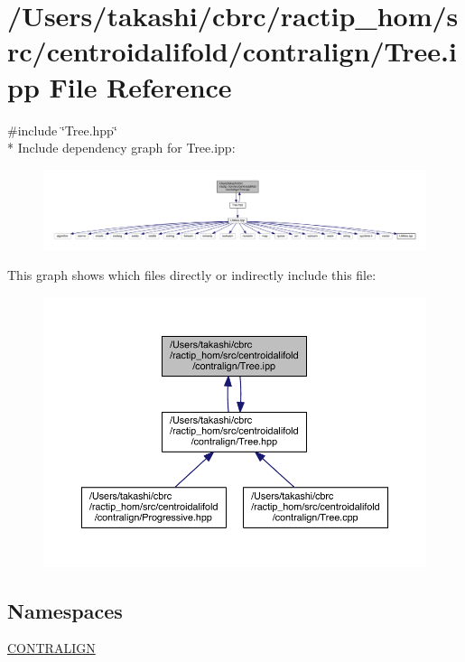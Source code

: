 \hypertarget{_tree_8ipp}{\section{/\+Users/takashi/cbrc/ractip\+\_\+hom/src/centroidalifold/contralign/\+Tree.ipp File Reference}
\label{_tree_8ipp}
}
{\ttfamily \#include \char`\"{}Tree.\+hpp\char`\"{}}\\*
Include dependency graph for Tree.\+ipp\+:
\nopagebreak
\begin{figure}[H]
\begin{center}
\leavevmode
\includegraphics[width=350pt]{_tree_8ipp__incl}
\end{center}
\end{figure}
This graph shows which files directly or indirectly include this file\+:
\nopagebreak
\begin{figure}[H]
\begin{center}
\leavevmode
\includegraphics[width=350pt]{_tree_8ipp__dep__incl}
\end{center}
\end{figure}
\subsection*{Namespaces}
\begin{DoxyCompactItemize}
\item 
 \hyperlink{namespace_c_o_n_t_r_a_l_i_g_n}{C\+O\+N\+T\+R\+A\+L\+I\+G\+N}
\end{DoxyCompactItemize}
